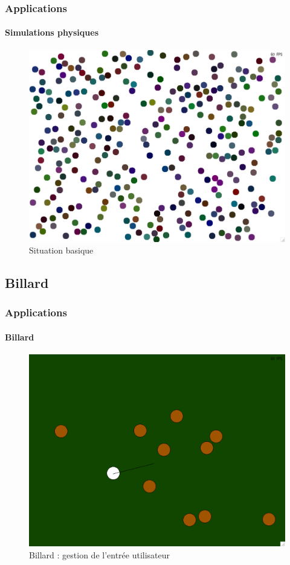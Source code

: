 \documentclass[xcolor=x11names,compress,11pt]{beamer}
\renewcommand{\(}{\begin{columns}}
\renewcommand{\)}{\end{columns}}
\newcommand{\<}[1]{\begin{column}{#1}}
\renewcommand{\>}{\end{column}}
\begin{document}
\begin{frame}
  \frametitle{Applications}
  \framesubtitle{Simulations physiques}
  \begin{figure}[h]
    \centering
    \includegraphics[scale=0.27]{test2.pdf}
    \caption{Situation basique}
  \end{figure}
\end{frame}

\subsection*{Billard}
\begin{frame}
  \frametitle{Applications}
  \framesubtitle{Billard}
  \begin{figure}[h]
    \centering
    \includegraphics[scale=0.27]{billard.pdf}
    \caption{Billard : gestion de l'entrée utilisateur}
    
  \end{figure}
\end{frame}
\end{document}
